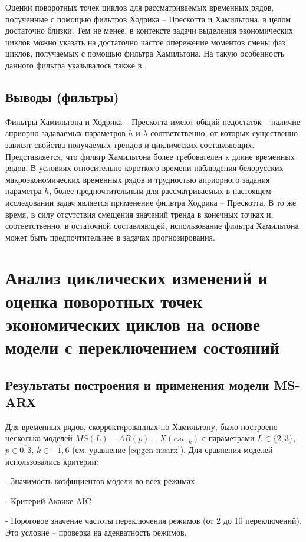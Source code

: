 \documentclass[a4paper,14pt]{extreport}
\begin{document}
	Оценки поворотных точек циклов для рассматриваемых временных рядов, полученные с помощью фильтров Ходрика – Прескотта и Хамильтона, в целом достаточно близки. Тем не менее, в контексте задачи выделения экономических циклов можно указать на достаточно частое опережение моментов смены фаз циклов, получаемых с помощью фильтра Хамильтона. На такую особенность данного фильтра указывалось также в \cite{schuler_detrend}.
	
	\subsection{Выводы (фильтры)}
	Фильтры Хамильтона и Ходрика – Прескотта  имеют  общий недостаток – наличие априорно задаваемых параметров $h$ и $\lambda$ соответственно, от которых существенно зависят свойства получаемых трендов и циклических составляющих. Представляется, что фильтр Хамильтона более требователен к длине временных рядов.  В условиях относительно короткого времени наблюдения белорусских макроэкономических временных рядов и трудностью априорного задания параметра $h$, более предпочтительным для рассматриваемых в настоящем исследовании задач является применение фильтра Ходрика – Прескотта. В то же время, в силу отсутствия смещения значений тренда в конечных точках и, соответственно, в остаточной составляющей, использование фильтра Хамильтона может быть предпочтительнее в  задачах прогнозирования.
	

	\section{Анализ циклических изменений и оценка поворотных точек экономических циклов на основе модели с переключением состояний}
	
	\subsection{Результаты построения и применения модели MS-ARХ}
	
	Для временных рядов, скорректированных по Хамильтону, было построено несколько моделей $MS(L)-AR(p)-X(esi_{-k})$ с параметрами $L \in \{2,3\}$, $p \in \overline{0,3}$, $k \in \overline{-1,6}$ (см. уравнение \ref{eq:gen-msarx}). Для сравнения моделей использовались критерии:
	
	- Значимость коэфициентов модели во всех режимах
	
	- Критерий Акаике AIC
	
	- Пороговое значение частоты переключения режимов (от 2 до 10 переключений). Это условие – проверка на адекватность режимов.
	
\end{document}
